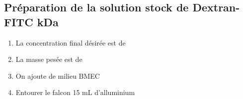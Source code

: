 \subsection{Préparation de la solution stock de Dextran-FITC  kDa}

\begin{enumerate}
\item La concentration final désirée est de  
\item La masse pesée est de   
\item On ajoute   de milieu BMEC
\item Entourer le falcon 15 mL d'alluminium
\end{enumerate}